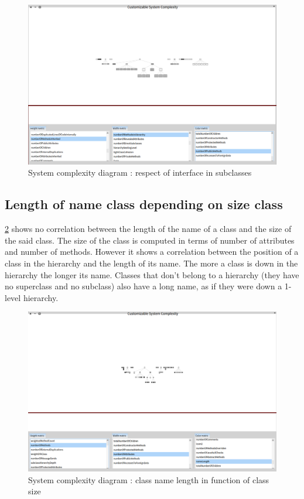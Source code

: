 \begin{figure}[H]
    \includegraphics[width=\textwidth]{numberofmethods2.png}
    \caption{\label{fig:numberofmethods} System complexity diagram : respect of interface in subclasses}
\end{figure}

\subsection{Length of name class depending on size class}
\ref{fig:namelength} shows no correlation between the length of the name of a class and the size of the said class. The size of the class is computed in terms of number of attributes and number of methods.
However it shows a correlation between the position of a class in the hierarchy and the length of its name. The more a class is down in the hierarchy the longer its name. Classes that don't belong to a hierarchy (they have no superclass and no subclass) also have a long name, as if they were down a 1-level hierarchy.
\begin{figure}[H]
    \includegraphics[width=\textwidth]{namelength.png}
    \caption{\label{fig:namelength} System complexity diagram : class name length in function of class size}
\end{figure}